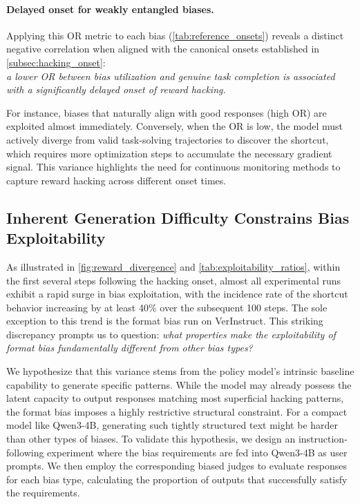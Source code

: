 \documentclass{llmxive}
\begin{document}
\paragraph{Delayed onset for weakly entangled biases.}
Applying this OR metric to each bias (\cref{tab:reference_onsets}) reveals a distinct negative correlation when aligned with the canonical onsets established in \cref{subsec:hacking_onset}: \\
\emph{a lower OR between bias utilization and genuine task completion is associated with a significantly delayed onset of reward hacking.}


For instance, biases that naturally align with good responses (high OR) are exploited almost immediately. Conversely, when the OR is low, the model must actively diverge from valid task-solving trajectories to discover the shortcut, which requires more optimization steps to accumulate the necessary gradient signal. This variance highlights the need for continuous monitoring methods to capture reward hacking across different onset times.

 \vspace{-2mm}

\subsection{Inherent Generation Difficulty Constrains Bias Exploitability}
\label{subsec:exploitability_complexity}

As illustrated in \cref{fig:reward_divergence} and \cref{tab:exploitability_ratios}, within the first several steps following the hacking onset, almost all experimental runs exhibit a rapid surge in bias exploitation, with the incidence rate of the shortcut behavior increasing by at least 40\% over the subsequent 100 steps. The sole exception to this trend is the format bias run on VerInstruct. This striking discrepancy prompts us to question: \textit{what properties make the exploitability of format bias fundamentally different from other bias types?}


We hypothesize that this variance stems from the policy model's intrinsic baseline capability to generate specific patterns. While the model may already possess the latent capacity to output responses matching most superficial hacking patterns, the format bias imposes a highly restrictive structural constraint. For a compact model like Qwen3-4B, generating such tightly structured text might be harder than other types of biases. To validate this hypothesis, we design an instruction-following experiment where the bias requirements are fed into Qwen3-4B as user prompts. We then employ the corresponding biased judges to evaluate responses for each bias type, calculating the proportion of outputs that successfully satisfy the requirements.
\end{document}
